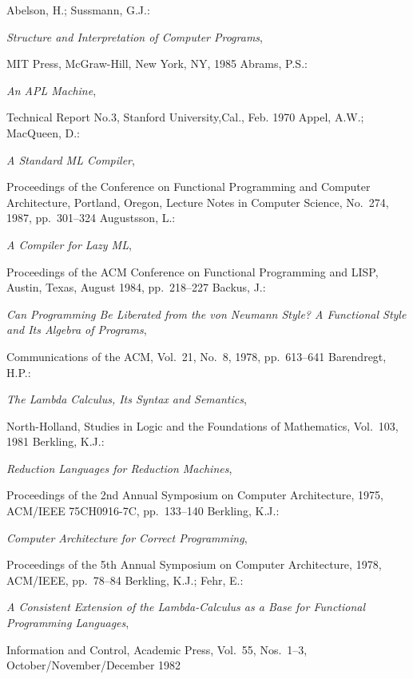 \newcommand{\mytitle}[1]{{\it #1},} %
\newcommand{\bmt}{} %
\newcommand{\amt}{} %
%
{\small

\begin{thebibliography}{AAAA}
%
Abelson, H.; Sussmann, G.J.:
\bmt
\mytitle{Structure and Interpretation of Computer Programs}
\amt
MIT Press, McGraw-Hill, New York, NY, 1985
%
Abrams, P.S.:
\bmt
\mytitle{An APL Machine}
\amt
Technical Report No.3, Stanford University,Cal., Feb. 1970
%
Appel, A.W.; MacQueen, D.:
\bmt
\mytitle{A Standard ML Compiler}
\amt
Proceedings of the Conference on
Functional Programming and Computer Architecture, Portland,
Oregon, Lecture Notes in Computer Science, No.~274, 1987,
pp.~301--324
%
Augustsson, L.:
\bmt
\mytitle{A Compiler for Lazy ML}
\amt
Proceedings of the ACM Conference on Functional Programming
and LISP, 
Austin, Texas, August 1984,
pp.~218--227
%
%
Backus, J.:
\bmt
\mytitle{Can Programming Be Liberated from the von Neumann Style?
A Functional Style and Its Algebra of Programs}
\amt
Communications of the ACM, Vol.~21, No.~8, 1978,
pp.~613--641
%
Barendregt, H.P.:
\bmt
\mytitle{The Lambda Calculus, Its Syntax and Semantics}
\amt
North-Holland, Studies in Logic and the Foundations of
Mathematics, Vol.~103, 1981
%
Berkling, K.J.:
\bmt
\mytitle{Reduction Languages for Reduction Machines}
\amt
Proceedings of the 2nd Annual Symposium on
Computer Architecture, 1975, ACM/IEEE 75CH0916-7C,
pp.~133--140
%
Berkling, K.J.:
\bmt
\mytitle{Computer Architecture for Correct Programming}
\amt
Proceedings of the 5th Annual Symposium on
Computer Architecture, 1978, ACM/IEEE,
pp.~78--84
%
Berkling, K.J.; Fehr, E.:
\bmt
\mytitle{A Consistent Extension of the Lambda-Calculus as a Base for
Functional Programming Languages}
\amt
Information and Control, Academic Press,
Vol.~55, Nos.~1--3, Oc\-to\-ber/No\-vem\-ber/De\-cem\-ber 1982

\end{thebibliography}}
